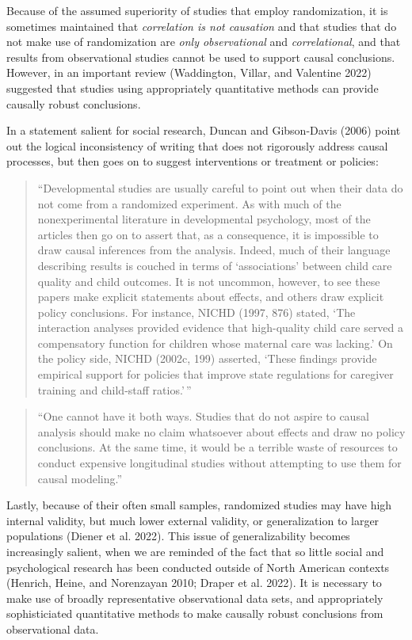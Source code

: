 \documentclass[
  letterpaper,
  DIV=11,
  numbers=noendperiod]{scrreprt}
\begin{document}
Because of the assumed superiority of studies that employ randomization,
it is sometimes maintained that \emph{correlation is not causation} and
that studies that do not make use of randomization are \emph{only
observational} and \emph{correlational}, and that results from
observational studies cannot be used to support causal conclusions.
However, in an important review (Waddington, Villar, and Valentine 2022)
suggested that studies using appropriately quantitative methods can
provide causally robust conclusions.

In a statement salient for social research, Duncan and Gibson-Davis
(2006) point out the logical inconsistency of writing that does not
rigorously address causal processes, but then goes on to suggest
interventions or treatment or policies:

\begin{quote}
``Developmental studies are usually careful to point out when their data
do not come from a randomized experiment. As with much of the
nonexperimental literature in developmental psychology, most of the
articles then go on to assert that, as a consequence, it is impossible
to draw causal inferences from the analysis. Indeed, much of their
language describing results is couched in terms of `associations'
between child care quality and child outcomes. It is not uncommon,
however, to see these papers make explicit statements about effects, and
others draw explicit policy conclusions. For instance, NICHD (1997, 876)
stated, `The interaction analyses provided evidence that high-quality
child care served a compensatory function for children whose maternal
care was lacking.' On the policy side, NICHD (2002c, 199) asserted,
`These findings provide empirical support for policies that improve
state regulations for caregiver training and child-staff ratios.'\,''
\end{quote}

\begin{quote}
``One cannot have it both ways. Studies that do not aspire to causal
analysis should make no claim whatsoever about effects and draw no
policy conclusions. At the same time, it would be a terrible waste of
resources to conduct expensive longitudinal studies without attempting
to use them for causal modeling.''
\end{quote}

Lastly, because of their often small samples, randomized studies may
have high internal validity, but much lower external validity, or
generalization to larger populations (Diener et al. 2022). This issue of
generalizability becomes increasingly salient, when we are reminded of
the fact that so little social and psychological research has been
conducted outside of North American contexts (Henrich, Heine, and
Norenzayan 2010; Draper et al. 2022). It is necessary to make use of
broadly representative observational data sets, and appropriately
sophisticiated quantitative methods to make causally robust conclusions
from observational data.
\end{document}
